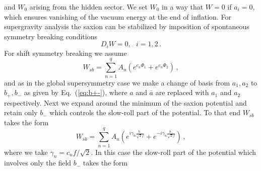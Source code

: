 \documentclass[12pt]{article}
\begin{document}
and $W_0$ arising from the hidden sector. We set $W_0$ in a way that $W = 0$ if $a_i = 0$, which ensures vanishing of the vacuum energy at the end of inflation.
For supergravity analysis the saxion can be stabilized by imposition of spontaneous symmetry breaking conditions~\cite{Nath:1983aw}
\begin{equation}
  D_i W = 0,
  ~~~ i = 1, 2\,.
\end{equation}
For shift symmetry breaking we assume
\begin{equation}
  W_{sb} = \sum_{n = 1}^q A_n \left(e^{c_n \Phi_1} + e^{c_n \Phi_2}\right)\,,
\end{equation}
and as in the global supersymmetry case we make a change of basis from $a_1, a_2$ to $b_+, b_-$ as given by Eq.~(\ref{eq:b+-}), where $a$ and $\bar a$ are replaced with $a_1$ and $a_2$ respectively.
Next we expand around the minimum of the saxion potential and retain only $b_-$ which controls the slow-roll part of the potential.
To that end $W_{sb}$ takes the form
\begin{equation}
  W_{sb} = \sum_{n = 1}^q A_n \left(
      e^{i \gamma_n \frac{b_-}{\sqrt{2} f}}
    + e^{-i \gamma_n \frac{b_-}{\sqrt{2} f}}
  \right)\,,
\end{equation}
where we take $\gamma_n = c_n f / \sqrt{2}$.
In this case the slow-roll part of the potential which involves only the field $b_-$ takes the form~
\end{document}
